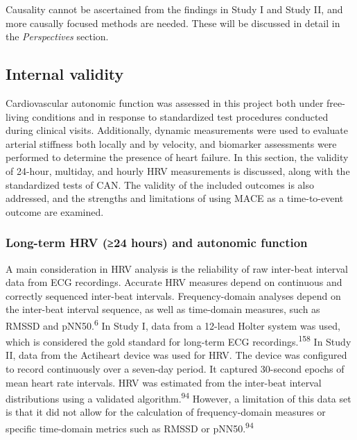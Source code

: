 \documentclass[
  a4paper,
  headsepline=true,
  open=left]{scrbook}
\begin{document}
Causality cannot be ascertained from the findings in Study I and Study
II, and more causally focused methods are needed. These will be
discussed in detail in the \emph{Perspectives} section.

\hypertarget{internal-validity}{%
\subsection{Internal validity}\label{internal-validity}}

Cardiovascular autonomic function was assessed in this project both
under free-living conditions and in response to standardized test
procedures conducted during clinical visits. Additionally, dynamic
measurements were used to evaluate arterial stiffness both locally and
by velocity, and biomarker assessments were performed to determine the
presence of heart failure. In this section, the validity of 24-hour,
multiday, and hourly HRV measurements is discussed, along with the
standardized tests of CAN. The validity of the included outcomes is also
addressed, and the strengths and limitations of using MACE as a
time-to-event outcome are examined.

\hypertarget{long-term-hrv-24-hours-and-autonomic-function}{%
\subsubsection{Long-term HRV (≥24 hours) and autonomic
function}\label{long-term-hrv-24-hours-and-autonomic-function}}

A main consideration in HRV analysis is the reliability of raw
inter-beat interval data from ECG recordings. Accurate HRV measures
depend on continuous and correctly sequenced inter-beat intervals.
Frequency-domain analyses depend on the inter-beat interval sequence, as
well as time-domain measures, such as RMSSD and
pNN50.\textsuperscript{6} In Study I, data from a 12-lead Holter system
was used, which is considered the gold standard for long-term ECG
recordings.\textsuperscript{158} In Study II, data from the Actiheart
device was used for HRV. The device was configured to record
continuously over a seven-day period. It captured 30-second epochs of
mean heart rate intervals. HRV was estimated from the inter-beat
interval distributions using a validated algorithm.\textsuperscript{94}
However, a limitation of this data set is that it did not allow for the
calculation of frequency-domain measures or specific time-domain metrics
such as RMSSD or pNN50.\textsuperscript{94}
\end{document}
